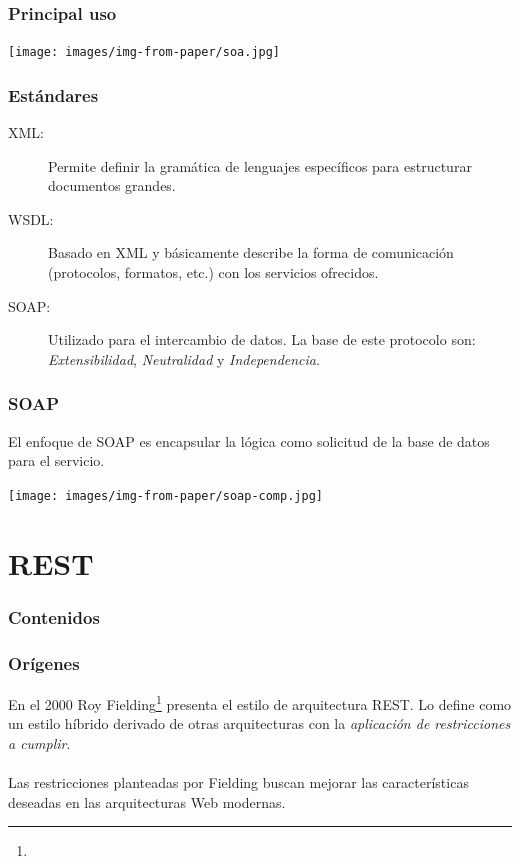 \documentclass{beamer}
\begin{document}
\begin{frame}{\insertsection{}}
  \frametitle{Principal uso}
  \centering
  \texttt{[image: images/img-from-paper/soa.jpg]}
\end{frame}

\begin{frame}{\insertsection{}}
  \frametitle{Estándares}
  \begin{description}
  \item[XML:] Permite definir la gramática de lenguajes
    específicos para estructurar documentos grandes.
  \item[WSDL:] Basado en XML y básicamente describe la forma de
    comunicación (protocolos, formatos, etc.) con los servicios
    ofrecidos.
  \item[SOAP:] Utilizado para el intercambio de datos. La base de este
    protocolo son: \emph{Extensibilidad}, \emph{Neutralidad} y
    \emph{Independencia}.
  \end{description}
\end{frame}

\begin{frame}{\insertsection{}}
  \frametitle{SOAP}
  El enfoque de SOAP es encapsular la lógica como solicitud de la base
  de datos para el servicio. 

  \vfill

  \centering
  \texttt{[image: images/img-from-paper/soap-comp.jpg]}
\end{frame}

\section{REST}

\begin{frame}
  \frametitle{Contenidos}
\end{frame}

\begin{frame}{\insertsection{}}
  \frametitle{Orígenes}
  En el 2000 Roy
    Fielding\footnote{}
    presenta el estilo de arquitectura REST. Lo define como un estilo
    híbrido derivado de otras arquitecturas con la \emph{aplicación de
    restricciones a cumplir}.
  \\~\\
  Las restricciones planteadas por Fielding buscan mejorar las
  características deseadas en las arquitecturas Web modernas. 
\end{frame}
\end{document}
